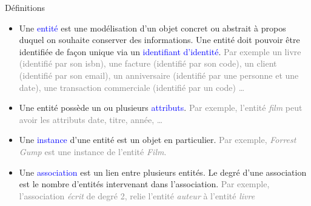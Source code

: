 \documentclass[10pt]{beamer}
\begin{document}
\begin{frame}{\Ctitle}{\stitle}
	\begin{alertblock}{Définitions}
		\begin{itemize}
			\item<1-> Une \textcolor{blue}{entité} est une modélisation d'un objet concret ou abstrait à propos duquel on souhaite conserver des informations. Une entité doit pouvoir être identifiée de façon unique via un \textcolor{blue}{identifiant d'identité}.
				\onslide<2->\textcolor{gray}{Par exemple un livre (identifié par son {\sc isbn}), une facture (identifié par son code), un client (identifié par son email), un anniversaire (identifié par une personne et une date), une transaction commerciale (identifié par un code) \dots} \\
			\item<3-> Une entité possède un ou plusieurs \textcolor{blue}{attributs}.
				\onslide<4->\textcolor{gray}{Par exemple, l'entité \textit{film} peut avoir les attributs date, titre, année, \dots}
			\item<5-> Une \textcolor{blue}{instance} d'une entité est un objet en particulier.
				\onslide<6-> \textcolor{gray}{Par exemple, \textit{Forrest Gump} est une instance de l'entité \textit{Film}.}
			\item<7->  Une \textcolor{blue}{association} est un lien entre plusieurs entités. Le degré d'une association est le nombre d'entités intervenant dans l'association.
				\onslide<8->\textcolor{gray}{Par exemple, l'association \textit{écrit} de degré 2, relie l'entité \textit{auteur}  à l'entité \textit{livre}}
		\end{itemize}
	\end{alertblock}
\end{frame}
\end{document}
